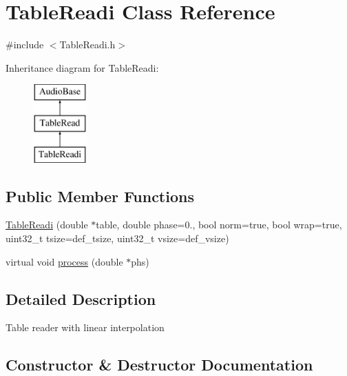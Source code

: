 \hypertarget{class_table_readi}{}\section{Table\+Readi Class Reference}
\label{class_table_readi}


{\ttfamily \#include $<$Table\+Readi.\+h$>$}

Inheritance diagram for Table\+Readi\+:\begin{figure}[H]
\begin{center}
\leavevmode
\includegraphics[height=3.000000cm]{class_table_readi}
\end{center}
\end{figure}
\subsection*{Public Member Functions}
\begin{DoxyCompactItemize}
\item 
\hyperlink{class_table_readi_aa5e834103bbeb0ea48982ec10c2c0e9a}{Table\+Readi} (double $\ast$table, double phase=0., bool norm=true, bool wrap=true, uint32\+\_\+t tsize=def\+\_\+tsize, uint32\+\_\+t vsize=def\+\_\+vsize)
\item 
virtual void \hyperlink{class_table_readi_a636913b122affaa2b7bde68114f35a4a}{process} (double $\ast$phs)
\end{DoxyCompactItemize}


\subsection{Detailed Description}
Table reader with linear interpolation 

\subsection{Constructor \& Destructor Documentation}
\mbox{\label{class_table_readi_aa5e834103bbeb0ea48982ec10c2c0e9a}} 
